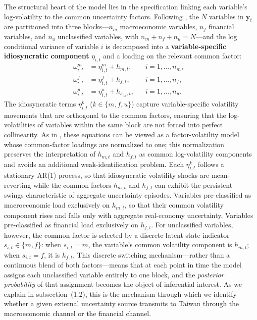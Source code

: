 The structural heart of the model lies in the specification linking each variable's log-volatility to the common uncertainty factors. Following \citet{davidson2025investigating}, the $N$ variables in $\mathbf{y}_t$ are partitioned into three blocks---$n_m$ macroeconomic variables, $n_f$ financial variables, and $n_u$ unclassified variables, with $n_m + n_f + n_u = N$---and the log conditional variance of variable $i$ is decomposed into a \textbf{variable-specific idiosyncratic component} $\eta_{i,t}$ and a loading on the relevant common factor:
%
\begin{equation}
\begin{aligned}
\omega_{i,t}^{m} &= \eta_{i,t}^{m} + h_{m,t},
&& i = 1,\ldots,n_m, \\[3pt]
\omega_{i,t}^{f} &= \eta_{i,t}^{f} + h_{f,t},
&& i = 1,\ldots,n_f, \\[3pt]
\omega_{i,t}^{u} &= \eta_{i,t}^{u} + h_{s_{i,t},t},
&& i = 1,\ldots,n_u.
\end{aligned}
\label{eq:variance}
\end{equation}
%
The idiosyncratic terms $\eta_{i,t}^{k}$ ($k \in \{m, f, u\}$) capture variable-specific volatility movements that are orthogonal to the common factors, ensuring that the log-volatilities of variables within the same block are not forced into perfect collinearity. As in \citet{davidson2025investigating}, these equations can be viewed as a factor-volatility model whose common-factor loadings are normalized to one; this normalization preserves the interpretation of $h_{m,t}$ and $h_{f,t}$ as common log-volatility components and avoids an additional weak-identification problem. Each $\eta_{i,t}^{k}$ follows a stationary AR(1) process, so that idiosyncratic volatility shocks are mean-reverting while the common factors $h_{m,t}$ and $h_{f,t}$ can exhibit the persistent swings characteristic of aggregate uncertainty episodes. Variables pre-classified as macroeconomic load exclusively on $h_{m,t}$, so that their common volatility component rises and falls only with aggregate real-economy uncertainty. Variables pre-classified as financial load exclusively on $h_{f,t}$. For unclassified variables, however, the common factor is selected by a discrete latent state indicator $s_{i,t} \in \{m, f\}$: when $s_{i,t} = m$, the variable's common volatility component is $h_{m,t}$; when $s_{i,t} = f$, it is $h_{f,t}$. This discrete switching mechanism---rather than a continuous blend of both factors---means that at each point in time the model assigns each unclassified variable entirely to one block, and the \textit{posterior probability} of that assignment becomes the object of inferential interest. As we explain in subsection~(1.2), this is the mechanism through which we identify whether a given external uncertainty source transmits to Taiwan through the macroeconomic channel or the financial channel.

